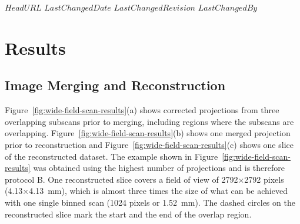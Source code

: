 \svnidlong
{$HeadURL$}
{$LastChangedDate$}
{$LastChangedRevision$}
{$LastChangedBy$}
%
\section{Results}\label{sec:Results}
\subsection{Image Merging and Reconstruction}\label{sec:Image Merging and Reconstruction}
Figure~\ref{fig:wide-field-scan-results}(a) shows corrected projections from three overlapping subscans prior to merging, including regions where the subscans are overlapping. Figure~\ref{fig:wide-field-scan-results}(b) shows one merged projection prior to reconstruction and Figure~\ref{fig:wide-field-scan-results}(c) shows one slice of the reconstructed dataset. The example shown in Figure~\ref{fig:wide-field-scan-results} was obtained using the highest number of projections and is therefore protocol B. One reconstructed slice covers a field of view of 2792$\times$2792 pixels (4.13$\times$\SI{4.13}{\milli\meter}), which is almost three times the size of what can be achieved with one single binned scan (1024 pixels or \SI{1.52}{\milli\meter}). %
The dashed circles on the reconstructed slice mark the start and the end of the overlap region.


